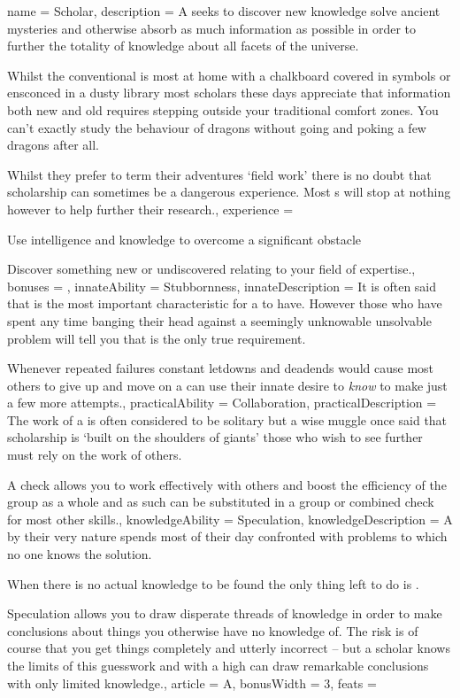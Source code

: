 \archetype
{
	name = Scholar,
	description = A \bname{} seeks to discover new knowledge\comma{} solve ancient mysteries and otherwise absorb as much information as possible\comma{} in order to further the totality of knowledge about all facets of the universe. 

Whilst the conventional \bname{} is most at home with a chalkboard covered in symbols\comma{} or ensconced in a dusty library\comma{} most scholars these days appreciate that information\comma{} both new and old\comma{} requires stepping outside your traditional comfort zones. You can’t exactly study the behaviour of dragons without going and poking a few dragons\comma{} after all. 

Whilst they prefer to term their adventures `field work’\comma{} there is no doubt that scholarship can sometimes be a dangerous experience. Most \bname{}s will stop at nothing\comma{} however\comma{} to help further their research.,
	experience = \item Use intelligence and knowledge to overcome a significant obstacle
\item Discover something new or undiscovered relating to your field of expertise.,
	bonuses = 
,
	innateAbility = Stubbornness,
	innateDescription = It is often said that  is the most important characteristic for a  to have. However\comma{} those who have spent any time banging their head against a seemingly unknowable\comma{} unsolvable problem will tell you that  is the only true requirement. 

Whenever repeated failures\comma{} constant letdowns and deadends would cause most others to give up and move on\comma{} a \bname{} can use their innate desire to {\it know} to make just a few more attempts.,
	practicalAbility = Collaboration,
	practicalDescription = The work of a \bname{} is often considered to be solitary\comma{} but a wise muggle once said that scholarship is `built on the shoulders of giants’ \minus{} those who wish to see further must rely on the work of others. 

A  check allows you to work effectively with others\comma{} and boost the efficiency of the group as a whole\comma{} and as such can be substituted in a group or combined check for most other skills.,
	knowledgeAbility = Speculation,
	knowledgeDescription = A \bname{}\comma{} by their very nature\comma{} spends most of their day confronted with problems to which no one knows the solution. 

When there is no actual knowledge to be found\comma{} the only thing left to do is . 

Speculation allows you to draw disperate threads of knowledge\comma{} in order to make conclusions about things you otherwise have no knowledge of. The risk is\comma{} of course\comma{} that you get things completely and utterly incorrect – but a scholar knows the limits of this guesswork\comma{} and with a high  can draw remarkable conclusions with only limited knowledge.,
	article = A,
	bonusWidth = 3, feats = \ScholarFeats
}


